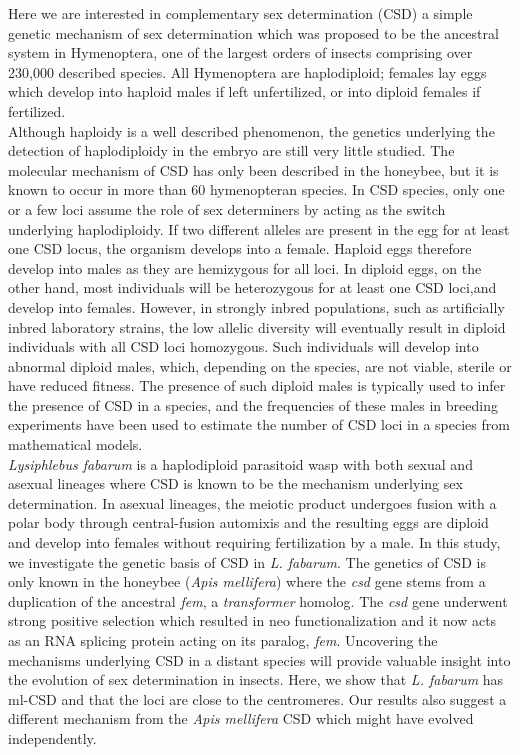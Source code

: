 \documentclass[11pt,a4paper]{report}
\begin{document}
Here we are interested in complementary sex determination (CSD) a simple genetic mechanism of sex determination which was proposed to be the ancestral system in Hymenoptera, one of the largest orders of insects comprising over 230,000 described species. All Hymenoptera are haplodiploid; females lay eggs which develop into haploid males if left unfertilized, or into diploid females if fertilized. \\
Although haploidy is a well described phenomenon, the genetics underlying the detection of haplodiploidy in the embryo are still very little studied. The molecular mechanism of CSD has only been described in the honeybee, but  it is known to occur in more than 60 hymenopteran species. In CSD species, only one or a few loci assume the role of sex determiners by acting as the switch underlying haplodiploidy. If two different alleles are present in the egg for at least one CSD locus, the organism develops into a female. Haploid eggs therefore develop into males as they are hemizygous for all loci. In diploid eggs, on the other hand, most individuals will be heterozygous for at least one CSD loci,and develop into females. However, in strongly inbred populations, such as artificially inbred laboratory strains, the low allelic diversity will eventually result in diploid individuals with all CSD loci homozygous. Such individuals will develop into abnormal diploid males, which, depending on the species, are not viable, sterile or have reduced fitness. The presence of such diploid males is typically used to infer the presence of CSD in a species, and the frequencies of these males in breeding experiments have been used to estimate the number of CSD loci in a species from mathematical models.\\
\textit{Lysiphlebus fabarum} is a haplodiploid parasitoid wasp with both sexual and asexual lineages where CSD is known to be the mechanism underlying sex determination. In asexual lineages, the meiotic product undergoes fusion with a polar body through central-fusion automixis and the resulting eggs are diploid and develop into females without requiring fertilization by a male. %
In this study, we investigate the genetic basis of CSD in \textit{L. fabarum}. The genetics of CSD is only known in the honeybee (\textit{Apis mellifera}) where the \textit{csd} gene stems from a duplication of the ancestral \textit{fem}, a \textit{transformer} homolog. The \textit{csd} gene underwent strong positive selection which resulted in neo functionalization and it now acts as an RNA splicing protein acting on its paralog, \textit{fem}. Uncovering the mechanisms underlying CSD in a distant species will provide valuable insight into the evolution of sex determination in insects. Here, we show that \textit{L. fabarum} has ml-CSD and that the loci are close to the centromeres. Our results also suggest a different mechanism from the \textit{Apis mellifera} CSD which might have evolved independently.
\end{document}
